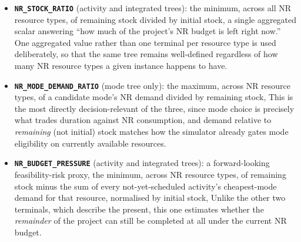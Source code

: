 \begin{itemize}
  \item \textbf{\texttt{NR\_STOCK\_RATIO}} (activity and integrated trees):
  the minimum, across all NR resource types, of remaining stock divided by
  initial stock,
  \changed{\[
    \texttt{NR\_STOCK\_RATIO} \;=\;
    \min_{k \in \mathcal{R}^{\nu}} \frac{\mathrm{rem}_k}{R^{\nu}_k},
  \]}
  a single aggregated scalar answering ``how much of the
  project's NR budget is left right now.'' One aggregated value rather than
  one terminal per resource type is used deliberately, so that the same
  tree remains well-defined regardless of how many NR resource types a
  given instance happens to have.
  \item \textbf{\texttt{NR\_MODE\_DEMAND\_RATIO}} (mode tree only): the
  maximum, across NR resource types, of a candidate mode's NR demand
  divided by remaining stock,
   This is the most directly decision-relevant
  of the three, since mode choice is precisely what trades duration against
  NR consumption, and demand relative to \emph{remaining} (not initial)
  stock matches how the simulator already gates mode eligibility on
  currently available resources.
  \item \textbf{\texttt{NR\_BUDGET\_PRESSURE}} (activity and integrated
  trees): a forward-looking feasibility-risk proxy, the minimum, across NR
  resource types, of remaining stock minus the sum of every not-yet-scheduled
  activity's cheapest-mode demand for that resource, normalised by initial
  stock,
  \changed{\[
    \texttt{NR\_BUDGET\_PRESSURE} \;=\;
    \min_{k \in \mathcal{R}^{\nu}}
    \frac{\mathrm{rem}_k - \sum_{i \in U} \min_{m \in \mathcal{M}_i} r^{\nu}_{imk}}{R^{\nu}_k}.
  \]}
  Unlike the other two terminals, which describe the present, this
  one estimates whether the \emph{remainder} of the project can still be
  completed at all under the current NR budget.
\end{itemize}

